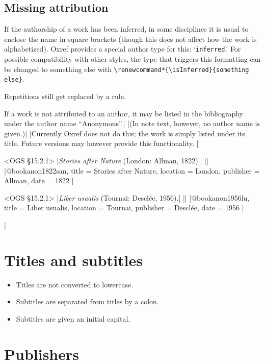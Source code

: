 \documentclass[extrafontsizes,11pt,a4paper,oneside]{memoir}
\newcommand*{\code}[1]{`\texttt{#1}'}
\def\isInferred{inferred}
\begin{document}
\subsection{Missing attribution}

If the authorship of a work has been inferred, in some disciplines it is usual
to enclose the name in square brackets (though this does not affect how the work
is alphabetized). Oxref provides a special author type for this: \code{inferred}.
For possible compatibility with other styles, the type that triggers this formatting
can be changed to something else with \lstinline!\renewcommand*{\isInferred}{something else}!.

Repetitions still get replaced by a rule.\\

If a work is not attributed to an author, it may be listed in the bibliography
under the author name \enquote{Anonymous}.|
\todoc[oxnotes]|(In note text, however, no author name is given.)|
\todoc|Currently Oxref does not do this; the work is simply listed under its title.
Future versions may however provide this functionality.
|

\bibexample<OGS \S15.2.1>
|\emph{Stories after Nature} (London: Allman, 1822).|%
||%
|@book{anon1822san,
  title = {Stories after Nature},
  location = {London},
  publisher = {Allman},
  date = {1822}
}|

\bibexample<OGS \S15.2.1>
|\emph{Liber usualis} (Tournai: Desclée, 1956).|%
||%
|@book{anon1956lu,
  title = {Liber usualis},
  location = {Tournai},
  publisher = {Desclée},
  date = {1956}
}|

\todoc|

\section{Titles and subtitles}

\begin{itemize}
  \item
  Titles are not converted to lowercase.
  
  \item
  Subtitles are separated from titles by a colon.
  
  \item
  Subtitles are given an initial capital.
  \par{}
\end{itemize}

\section{Publishers}
\end{document}
